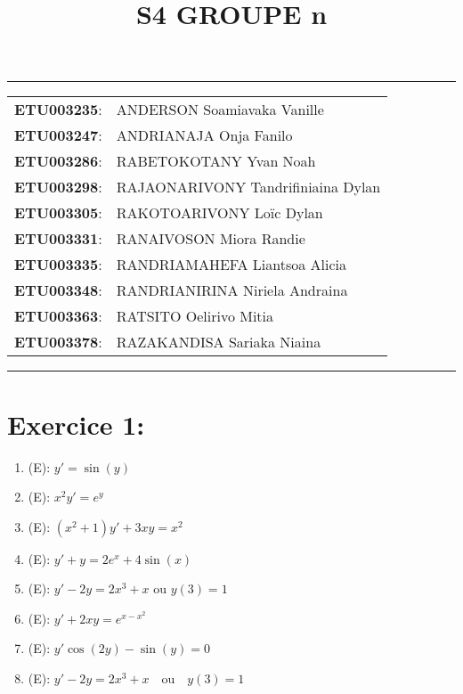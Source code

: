 \documentclass[a4paper,12pt]{article}
\begin{document}
	
\title{\textbf{S4 GROUPE n}}
\date{}
\maketitle

\hrule
\vspace{1em}

\begin{tabular}{rl}
	\textbf{ETU003235}: & ANDERSON Soamiavaka Vanille \\
	\textbf{ETU003247}: & ANDRIANAJA Onja Fanilo \\
	\textbf{ETU003286}: & RABETOKOTANY Yvan Noah \\
	\textbf{ETU003298}: & RAJAONARIVONY Tandrifiniaina Dylan \\
	\textbf{ETU003305}: & RAKOTOARIVONY Loïc Dylan \\
	\textbf{ETU003331}: & RANAIVOSON Miora Randie \\
	\textbf{ETU003335}: & RANDRIAMAHEFA Liantsoa Alicia \\
	\textbf{ETU003348}: & RANDRIANIRINA Niriela Andraina \\
	\textbf{ETU003363}: & RATSITO Oelirivo Mitia \\
	\textbf{ETU003378}: & RAZAKANDISA Sariaka Niaina \\
\end{tabular}

\vspace{1em}
\hrule

\newpage
\section*{Exercice 1:}
\begin{enumerate}
	\item (E): $y' = \sin(y)$ \\

	\item (E): $x^2 y' = e^y$ \\
	

	\item (E): $(x^2 + 1) y' + 3xy = x^2$ \\
	
		
	\item (E): $y' + y = 2e^x + 4 \sin(x)$ \\
	
	
	\item (E): $y' - 2y = 2x^3 + x \text{ ou } y(3)=1$

	\item (E): $y' + 2xy = e^{x-x^2}$

	\item (E): $y' \cos(2y) - \sin(y) = 0$

	\item (E): $y' - 2y = 2x^3 + x \quad \text{ou} \quad y(3)=1$
\end{enumerate}
\end{document}
